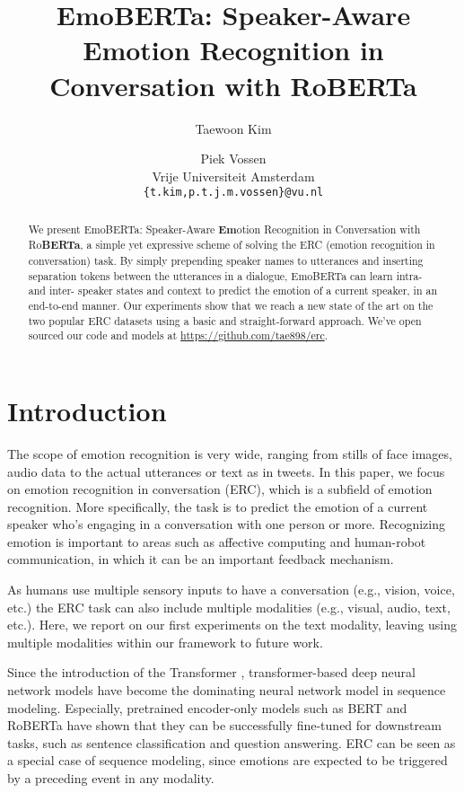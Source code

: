 \documentclass[11pt]{article}
\title{EmoBERTa: Speaker-Aware Emotion Recognition in Conversation with RoBERTa}
\author{Taewoon Kim \and
Piek Vossen \\
Vrije Universiteit Amsterdam\\
\texttt{\{t.kim,p.t.j.m.vossen\}@vu.nl} \\
 }
\begin{document}
\maketitle
\begin{abstract}
We present EmoBERTa: Speaker-Aware \textbf{Em}otion Recognition in Conversation with Ro\textbf{BERTa}, a simple yet expressive scheme of solving the ERC (emotion recognition in conversation) task. By simply prepending speaker names to utterances and inserting separation tokens between the utterances in a dialogue, EmoBERTa can learn intra- and inter- speaker states and context to predict the emotion of a current speaker, in an end-to-end manner. Our experiments show that we reach a new state of the art on the two popular ERC datasets using a basic and straight-forward approach. We've open sourced our code and models at \url{https://github.com/tae898/erc}.

\end{abstract}

\section{Introduction} \label{Introduction}

The scope of emotion recognition is very wide, ranging from stills of face images, audio data to the actual utterances or text as in tweets.
In this paper, we focus on emotion recognition in conversation (ERC), which is a subfield of emotion recognition. More specifically, the task is to predict the emotion of a current speaker who's engaging in a conversation with one person or more. Recognizing emotion is important to areas such as affective computing and human-robot communication, in which it can be an important feedback mechanism.

As humans use multiple sensory inputs to have a conversation (e.g., vision, voice, etc.) the ERC task can also include multiple modalities (e.g., visual, audio, text, etc.). Here, we report on our first experiments on the text modality, leaving using multiple modalities within our framework to future work.

Since the introduction of the Transformer \citep{NIPS2017_3f5ee243}, transformer-based deep neural network models have become the dominating neural network model in sequence modeling. Especially, pretrained encoder-only models such as BERT \citep{devlin-etal-2019-bert} and RoBERTa \citep{liu2019roberta} have shown that they can be successfully fine-tuned for downstream tasks, such as sentence classification and question answering. ERC can be seen as a special case of sequence modeling, since emotions are expected to be triggered by a preceding event in any modality.
\end{document}
